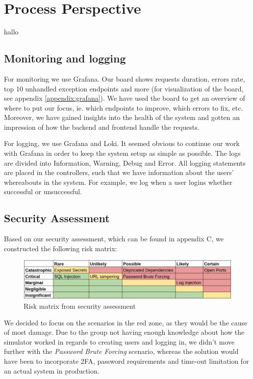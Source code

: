 \section{Process Perspective}
hallo \cite{devopshandbook}
\subsection{Monitoring and logging}
For monitoring we use Grafana. Our board shows requests duration, errors rate, top 10 unhandled exception endpoints and more (for visualization of the board, see appendix \ref{appendix:grafana}). We have used the board to get an overview of where to put our focus, ie. which endpoints to improve, which errors to fix, etc. Moreover, we have gained insights into the health of the system and gotten an impression of how the backend and frontend handle the requests.

For logging, we use Grafana and Loki. It seemed obvious to continue our work with Grafana in order to keep the system setup as simple as possible. The logs are divided into Information, Warning, Debug and Error. All logging statements are placed in the controllers, such that we have information about the users' whereabouts in the system. For example, we log when a user logins whether successful or unsuccessful.

\subsection{Security Assessment}
Based on our security assessment, which can be found in appendix C, we constructed the following risk matrix:
\begin{figure}[H]
    \centering
    \includegraphics[width=0.7\linewidth]{images/risk-matrix.png}
    \caption{Risk matrix from security assessment}
    \label{fig:enter-label}
\end{figure}
We decided to focus on the scenarios in the red zone, as they would be the cause of most damage. Due to the group not having enough knowledge about how the simulator worked in regards to creating users and logging in, we didn't move further with the \textit{Password Brute Forcing} scenario, whereas the solution would have been to incorporate 2FA, password requirements and time-out limitation for an actual system in production.

